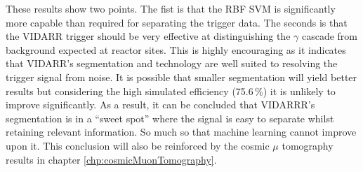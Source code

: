 \clearpage
These results show two points. The fist is that the RBF SVM is significantly more capable than required for separating the trigger data. The seconds is that the VIDARR trigger should be very effective at distinguishing the $\gamma$ cascade from background expected at reactor sites. This is highly encouraging as it indicates that VIDARR's segmentation and technology are well suited to resolving the trigger signal from noise. It is possible that smaller segmentation will yield better results but considering the high simulated efficiency (75.6\,\%) it is unlikely to improve significantly. As a result, it can be concluded that VIDARRR's segmentation is in a ``sweet spot'' where the signal is easy to separate whilst retaining relevant information. So much so that machine learning cannot improve upon it. This conclusion will also be reinforced by the cosmic $\mu$ tomography results in chapter \ref{chp:cosmicMuonTomography}.



